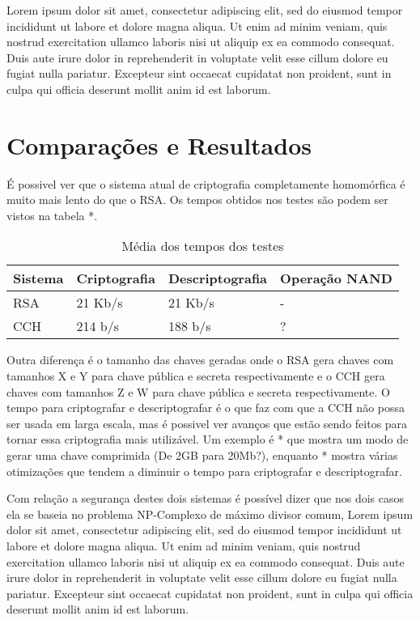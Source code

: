 Lorem ipsum dolor sit amet, consectetur adipiscing elit, sed do eiusmod tempor incididunt ut labore et dolore magna aliqua. Ut enim ad minim veniam, quis nostrud exercitation ullamco laboris nisi ut aliquip ex ea commodo consequat. Duis aute irure dolor in reprehenderit in voluptate velit esse cillum dolore eu fugiat nulla pariatur. Excepteur sint occaecat cupidatat non proident, sunt in culpa qui officia deserunt mollit anim id est laborum.
	
\section{Comparações e Resultados}
É possivel ver que o sistema atual de criptografia completamente homomórfica é muito mais lento do que o RSA. Os tempos obtidos nos testes são podem ser vistos na tabela *.
	
\begin{table}[!h]
  \centering
  \begin{tabular}{ |l|l|l|l| }
    \hline
      Sistema & Criptografia & Descriptografia & Operação NAND \\
    \hline
      RSA & 21 Kb/s & 21 Kb/s & - \\
    \hline
      CCH & 214 b/s & 188 b/s & ? \\
    \hline
  \end{tabular}
  \caption{Média dos tempos dos testes}
  \label{tab:LABEL_TAB_RESULTADOS}
\end{table}

Outra diferença é o tamanho das chaves geradas onde o RSA gera chaves com tamanhos X e Y para chave pública e secreta respectivamente e o CCH gera chaves com tamanhos Z e W para chave pública e secreta respectivamente. O tempo para criptografar e descriptografar é o que faz com que a CCH não possa ser usada em larga escala, mas é possivel ver avanços que estão sendo feitos para tornar essa criptografia mais utilizável. Um exemplo é * que mostra um modo de gerar uma chave comprimida (De 2GB para 20Mb?), enquanto * mostra várias otimizações que tendem a diminuir o tempo para criptografar e descriptografar.
	
Com relação a segurança destes dois sistemas é possível dizer que nos dois casos ela se baseia no problema NP-Complexo de máximo divisor comum,
Lorem ipsum dolor sit amet, consectetur adipiscing elit, sed do eiusmod tempor incididunt ut labore et dolore magna aliqua. Ut enim ad minim veniam, quis nostrud exercitation ullamco laboris nisi ut aliquip ex ea commodo consequat. Duis aute irure dolor in reprehenderit in voluptate velit esse cillum dolore eu fugiat nulla pariatur. Excepteur sint occaecat cupidatat non proident, sunt in culpa qui officia deserunt mollit anim id est laborum.
	
